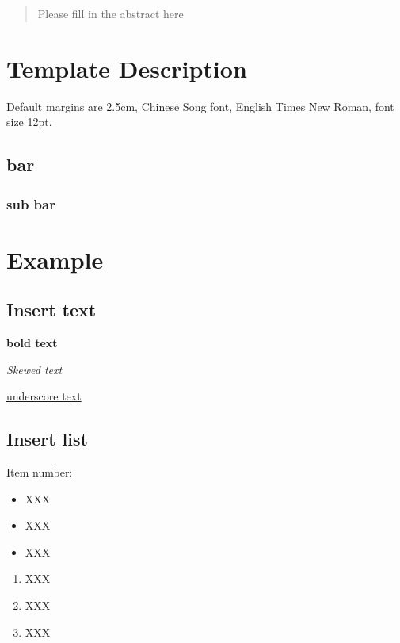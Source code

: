 \documentclass[12pt,hyperref,a4paper,UTF8]{article}
\begin{document}
\cover
\thispagestyle{empty}%
\newpage
\begin{abstract}
    Please fill in the abstract here
\end{abstract}


\newpage
\tableofcontents

\newpage

\section{Template Description}
Default margins are 2.5cm, Chinese Song font, English Times New Roman, font size 12pt.
\subsection{bar}
\subsubsection{sub bar}
\section{Example}

\subsection{Insert text}
\textbf{bold text}

\textit{Skewed text}

\underline{underscore text}

\subsection{Insert list}
Item number:

\begin{itemize}
    \item XXX
    \item XXX
    \item XXX
\end{itemize}

\begin{enumerate}
    \item XXX
    \item XXX
    \item XXX
\end{enumerate}
\end{document}
